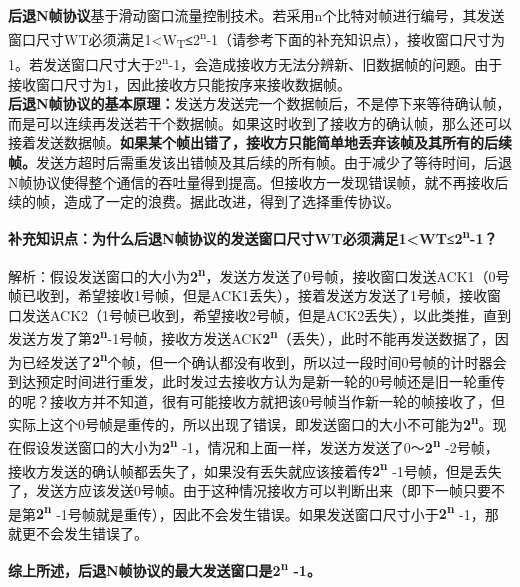 \textbf{{后退N帧协议}}基于滑动窗口流量控制技术。若采用n个比特对帧进行编号，其发送窗口尺寸WT必须满足1\textless{}W\textsubscript{T}\textbf{≤}2\textsuperscript{n}-1（请参考下面的补充知识点），接收窗口尺寸为1。若发送窗口尺寸大于{2}\textsuperscript{n}{-1}，会造成接收方无法分辨新、旧数据帧的问题。由于接收窗口尺寸为1，因此接收方只能按序来接收数据帧。\\

\textbf{后退N帧协议的基本原理：}发送方发送完一个数据帧后，不是停下来等待确认帧，而是可以连续再发送若干个数据帧。如果这时收到了接收方的确认帧，那么还可以接着发送数据帧。\textbf{如果某个帧出错了，接收方只能简单地丢弃该帧及其所有的后续帧。}发送方超时后需重发该出错帧及其后续的所有帧。由于减少了等待时间，后退N帧协议使得整个通信的吞吐量得到提高。但接收方一发现错误帧，就不再接收后续的帧，造成了一定的浪费。据此改进，得到了选择重传协议。

\textbf{{补充知识点：为什么后退N帧协议的发送窗口尺寸WT必须满足1\textless{}WT≤}{2}\textsuperscript{{n}}{-1}{？}}

解析：假设发送窗口的大小为\textbf{2\textsuperscript{n}}，发送方发送了0号帧，接收窗口发送ACK1（0号帧已收到，希望接收1号帧，但是ACK1丢失），接着发送方发送了1号帧，接收窗口发送ACK2（1号帧已收到，希望接收2号帧，但是ACK2丢失），以此类推，直到发送方发了第\textbf{2\textsuperscript{n}}-1号帧，接收方发送ACK\textbf{2\textsuperscript{n}}（丢失），此时不能再发送数据了，因为已经发送了\textbf{2\textsuperscript{n}}个帧，但一个确认都没有收到，所以过一段时间0号帧的计时器会到达预定时间进行重发，此时发过去接收方认为是新一轮的0号帧还是旧一轮重传的呢？接收方并不知道，很有可能接收方就把该0号帧当作新一轮的帧接收了，但实际上这个0号帧是重传的，所以出现了错误，即发送窗口的大小不可能为\textbf{2\textsuperscript{n}}。现在假设发送窗口的大小为\textbf{2\textsuperscript{n}}
-1，情况和上面一样，发送方发送了0～\textbf{2\textsuperscript{n}}
-2号帧，接收方发送的确认帧都丢失了，如果没有丢失就应该接着传\textbf{2\textsuperscript{n}}
-1号帧，但是丢失了，发送方应该发送0号帧。由于这种情况接收方可以判断出来（即下一帧只要不是第\textbf{2\textsuperscript{n}}
-1号帧就是重传），因此不会发生错误。如果发送窗口尺寸小于\textbf{2\textsuperscript{n}}
-1，那就更不会发生错误了。

\textbf{综上所述，后退N帧协议的最大发送窗口是\textbf{2\textsuperscript{n}}
-1。}
